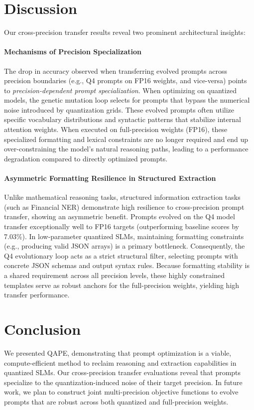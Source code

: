 \documentclass[11pt]{article}
\begin{document}
\section{Discussion}
Our cross-precision transfer results reveal two prominent architectural insights:

\paragraph{Mechanisms of Precision Specialization}
The drop in accuracy observed when transferring evolved prompts across precision boundaries (e.g., Q4 prompts on FP16 weights, and vice-versa) points to \textit{precision-dependent prompt specialization}. When optimizing on quantized models, the genetic mutation loop selects for prompts that bypass the numerical noise introduced by quantization grids. These evolved prompts often utilize specific vocabulary distributions and syntactic patterns that stabilize internal attention weights. When executed on full-precision weights (FP16), these specialized formatting and lexical constraints are no longer required and end up over-constraining the model's natural reasoning paths, leading to a performance degradation compared to directly optimized prompts.

\paragraph{Asymmetric Formatting Resilience in Structured Extraction}
Unlike mathematical reasoning tasks, structured information extraction tasks (such as Financial NER) demonstrate high resilience to cross-precision prompt transfer, showing an asymmetric benefit. Prompts evolved on the Q4 model transfer exceptionally well to FP16 targets (outperforming baseline scores by 7.03\%). In low-parameter quantized SLMs, maintaining formatting constraints (e.g., producing valid JSON arrays) is a primary bottleneck. Consequently, the Q4 evolutionary loop acts as a strict structural filter, selecting prompts with concrete JSON schemas and output syntax rules. Because formatting stability is a shared requirement across all precision levels, these highly constrained templates serve as robust anchors for the full-precision weights, yielding high transfer performance.

\section{Conclusion}
We presented QAPE, demonstrating that prompt optimization is a viable, compute-efficient method to reclaim reasoning and extraction capabilities in quantized SLMs. Our cross-precision transfer evaluations reveal that prompts specialize to the quantization-induced noise of their target precision. In future work, we plan to construct joint multi-precision objective functions to evolve prompts that are robust across both quantized and full-precision weights.
\end{document}
